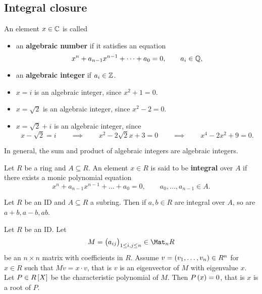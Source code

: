 \pagebreak

\subsection{Integral closure}

\begin{definition}
An element $ x \in \mathbb{C} $ is called
\begin{itemize}
\item an \textbf{algebraic number} if it satisfies an equation
$$ x^n + a_{n - 1}x^{n - 1} + \dots + a_0 = 0, \qquad a_i \in \mathbb{Q}, $$
\item an \textbf{algebraic integer} if $ a_i \in \mathbb{Z} $.
\end{itemize}
\end{definition}

\begin{example*}
\hfill
\begin{itemize}
\item $ x = i $ is an algebraic integer, since $ x^2 + 1 = 0 $.
\item $ x = \sqrt{2} $ is an algebraic integer, since $ x^2 - 2 = 0 $.
\item $ x = \sqrt{2} + i $ is an algebraic integer, since
$$ x - \sqrt{2} = i \qquad \implies \qquad x^2 - 2\sqrt{2}x + 3 = 0 \qquad \implies \qquad x^4 - 2x^2 + 9 = 0. $$
\end{itemize}
\end{example*}

In general, the sum and product of algebraic integers are algebraic integers.

\begin{definition}
Let $ R $ be a ring and $ A \subseteq R $. An element $ x \in R $ is said to be \textbf{integral} over $ A $ if there exists a monic polynomial equation
$$ x^n + a_{n - 1}x^{n - 1} + \dots + a_0 = 0, \qquad a_0, \dots, a_{n - 1} \in A. $$
\end{definition}

\begin{theorem}
\label{thm:integralsubring}
Let $ R $ be an ID and $ A \subseteq R $ a subring. Then if $ a, b \in R $ are integral over $ A $, so are $ a + b, a - b, ab $.
\end{theorem}

\begin{lemma}
\label{lem:cayleyhamilton}
Let $ R $ be an ID. Let
$$ M = \br{a_{ij}}_{1 \le i, j \le n} \in \Mat_n R $$
be an $ n \times n $ matrix with coefficients in $ R $. Assume $ v = \br{v_1, \dots, v_n} \in R^n $ for $ x \in R $ such that $ Mv = x \cdot v $, that is $ v $ is an eigenvector of $ M $ with eigenvalue $ x $. Let $ P \in R\sbr{X} $ be the characteristic polynomial of $ M $. Then $ P\br{x} = 0 $, that is $ x $ is a root of $ P $.
\end{lemma}

